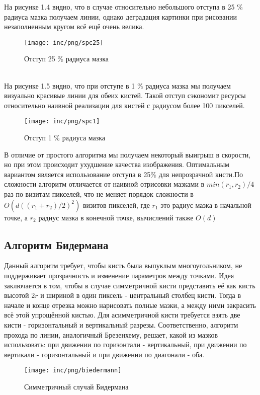 На рисунке 1.4 видно, что в случае относительно небольшого отступа в 25 \% радиуса мазка получаем линии, однако деградация картинки при рисовании незаполненным кругом всё ещё очень велика.
\begin{figure}
	[ht]
	\centering
	\texttt{[image: inc/png/spc25]}
	\caption{Отступ 25 \% радиуса мазка}
	\label{fig:fig03}
\end{figure}\\

На рисунке 1.5 видно, что при отступе в 1 \% радиуса мазка мы получаем визуально красивые линии для обеих кистей. Такой отступ сэкономит ресурсы относительно наивной реализации для кистей с радиусом более 100 пикселей.
\begin{figure}
	[!ht]
	\centering
	\texttt{[image: inc/png/spc1]}
	\caption{Отступ 1 \%  радиуса мазка}
	\label{fig:fig04}
\end{figure}

В отличие от простого алгоритма мы получаем некоторый выигрыш в скорости, но при этом происходит ухудшение качества изображения. Оптимальным вариантом является использование отступа в 25\% для непрозрачной кисти\cite{bp04}.По сложности алгоритм отличается от наивной отрисовки мазками в $min(r_1,r_2)/4$ раз по визитам пикселей, что не меняет порядок сложности в $O(d((r_1+r_2)/2)^2)$ визитов пикселей, где $r_1$ это радиус мазка в начальной точке, а $r_2$ радиус мазка в конечной точке, вычислений также $O(d)$

\subsection{Алгоритм Бидермана}
Данный алгоритм требует, чтобы кисть была выпуклым многоугольником, не поддерживает прозрачность и изменение параметров между точками. Идея заключается в том, чтобы в случае симметричной кисти представить её как кисть высотой $2r$ и шириной в один пиксель - центральный столбец кисти. Тогда в начале и конце отрезка можно нарисовать полные мазки, а между ними закрасить всё этой упрощённой кистью. Для асимметричной кисти требуется взять две кисти - горизонтальный и вертикальный разрезы. Соответственно, алгоритм прохода по линии, аналогичный Брезенхему, решает, какой из мазков использовать: при движении по горизонтали - вертикальный, при движении по вертикали - горизонтальный и при движении по диагонали - оба.\cite{vc85}

\begin{figure}
	[ht]
	\centering
	\texttt{[image: inc/png/biedermann]}
	\caption{Симметричный случай Бидермана}
	\label{fig:fig05}
\end{figure}

